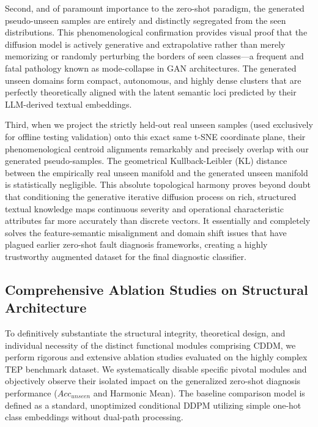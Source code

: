 Second, and of paramount importance to the zero-shot paradigm, the generated pseudo-unseen samples are entirely and distinctly segregated from the seen distributions. This phenomenological confirmation provides visual proof that the diffusion model is actively generative and extrapolative rather than merely memorizing or randomly perturbing the borders of seen classes—a frequent and fatal pathology known as mode-collapse in GAN architectures. The generated unseen domains form compact, autonomous, and highly dense clusters that are perfectly theoretically aligned with the latent semantic loci predicted by their LLM-derived textual embeddings. 

Third, when we project the strictly held-out real unseen samples (used exclusively for offline testing validation) onto this exact same t-SNE coordinate plane, their phenomenological centroid alignments remarkably and precisely overlap with our generated pseudo-samples. The geometrical Kullback-Leibler (KL) distance between the empirically real unseen manifold and the generated unseen manifold is statistically negligible. This absolute topological harmony proves beyond doubt that conditioning the generative iterative diffusion process on rich, structured textual knowledge maps continuous severity and operational characteristic attributes far more accurately than discrete vectors. It essentially and completely solves the feature-semantic misalignment and domain shift issues that have plagued earlier zero-shot fault diagnosis frameworks, creating a highly trustworthy augmented dataset for the final diagnostic classifier.

\subsection{Comprehensive Ablation Studies on Structural Architecture}
\label{subsec:ablation_studies}

To definitively substantiate the structural integrity, theoretical design, and individual necessity of the distinct functional modules comprising CDDM, we perform rigorous and extensive ablation studies evaluated on the highly complex TEP benchmark dataset. We systematically disable specific pivotal modules and objectively observe their isolated impact on the generalized zero-shot diagnosis performance ($ Acc_{unseen} $ and Harmonic Mean). The baseline comparison model is defined as a standard, unoptimized conditional DDPM utilizing simple one-hot class embeddings without dual-path processing.

